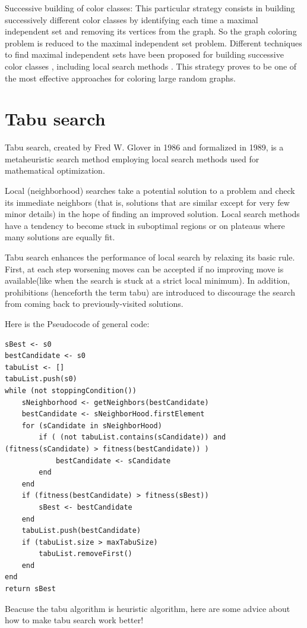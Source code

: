 \documentclass[10pt, a4paper, twocolumn]{article} %
\begin{document}
Successive building of color classes: This particular strategy consists in building successively
different color classes by identifying each time a maximal independent set and
removing its vertices from the graph. So the graph coloring problem is reduced to the
maximal independent set problem. Different techniques to find maximal independent sets
have been proposed for building successive color classes , including local
search methods . This strategy proves to be one of the most effective approaches
for coloring large random graphs.


\section{Tabu search}
Tabu search, created by Fred W. Glover in 1986 \citep{Reference5} and formalized
\citep{Reference6} \citep{Reference7} in 1989, is a metaheuristic search method
employing local search methods used for mathematical optimization.

Local (neighborhood) searches take a potential solution to a problem and check
its immediate neighbors (that is, solutions that are similar except for very few
minor details) in the hope of finding an improved solution. Local search methods
have a tendency to become stuck in suboptimal regions or on plateaus where many
solutions are equally fit.

Tabu search enhances the performance \citep{Reference8} of local search by relaxing its basic rule.
First, at each step worsening moves can be accepted if no improving move is
available(like when the search is stuck at a strict local minimum).
In addition, prohibitions (henceforth the term tabu) are introduced to
discourage the search from coming back to previously-visited solutions.

Here is the Pseudocode of general code:
\begin{lstlisting}
sBest <- s0
bestCandidate <- s0
tabuList <- []
tabuList.push(s0)
while (not stoppingCondition())
	sNeighborhood <- getNeighbors(bestCandidate)
	bestCandidate <- sNeighborHood.firstElement
	for (sCandidate in sNeighborHood)
		if ( (not tabuList.contains(sCandidate)) and (fitness(sCandidate) > fitness(bestCandidate)) )
			bestCandidate <- sCandidate
		end
	end
	if (fitness(bestCandidate) > fitness(sBest))
		sBest <- bestCandidate
	end
	tabuList.push(bestCandidate)
	if (tabuList.size > maxTabuSize)
		tabuList.removeFirst()
	end
end
return sBest
\end{lstlisting}

Beacuse the tabu algorithm is heuristic algorithm, here are some advice
\citep{Reference9} about how to make tabu search work better!
\end{document}
